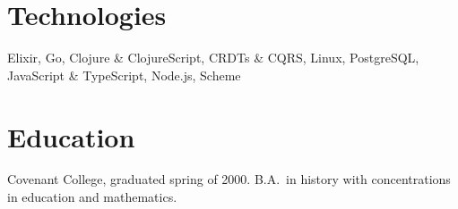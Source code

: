 \documentclass[margin]{res}
\begin{document}
\begin{resume}
\section{Technologies}

Elixir, Go, Clojure \& ClojureScript, CRDTs \& CQRS, Linux,
PostgreSQL, JavaScript \& TypeScript, Node.js, Scheme

\section{Education}

Covenant College, graduated spring of 2000. B.A.\ in history with
concentrations in education and mathematics.

\end{resume}
\end{document}
